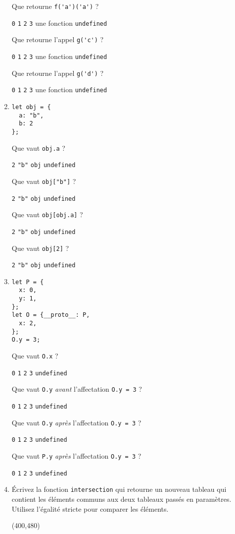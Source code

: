\documentclass[a4paper, 12pt]{article}
\newcommand{\choice}[1]{\Square\hspace{2pt} #1\hspace{5pt}}
\newcommand{\choicec}[1]{\Square\hspace{2pt} \lstinline{#1}\hspace{5pt}}
\begin{document}
\begin{enumerate}
  Que retourne \lstinline{f('a')('a')} ?

  \choicec{0} \choicec{1} \choicec{2} \choicec{3} \choice{une fonction} \choicec{undefined}

  Que retourne l'appel \lstinline{g('c')} ?

  \choicec{0} \choicec{1} \choicec{2} \choicec{3} \choice{une fonction} \choicec{undefined}

  Que retourne l'appel \lstinline{g('d')} ?

  \choicec{0} \choicec{1} \choicec{2} \choicec{3} \choice{une fonction} \choicec{undefined}
\item \lstset{language=javascript}
\begin{lstlisting}
let obj = {
  a: "b",
  b: 2
};
\end{lstlisting}

  Que vaut \lstinline{obj.a} ?

  \choicec{2} \choicec{"b"} \choicec{obj} \choicec{undefined}

  Que vaut \lstinline{obj["b"]} ?

  \choicec{2} \choicec{"b"} \choicec{obj} \choicec{undefined}

  Que vaut \lstinline{obj[obj.a]} ?

  \choicec{2} \choicec{"b"} \choicec{obj} \choicec{undefined}

  Que vaut \lstinline{obj[2]} ?

  \choicec{2} \choicec{"b"} \choicec{obj} \choicec{undefined}
\item \begin{lstlisting}
let P = {
  x: 0,
  y: 1,
};
let O = {__proto__: P,
  x: 2,
};
O.y = 3;
\end{lstlisting}

  Que vaut \lstinline{O.x} ?

  \choicec{0} \choicec{1} \choicec{2} \choicec{3} \choicec{undefined}

  Que vaut \lstinline{O.y} \emph{avant} l'affectation \lstinline{O.y = 3} ?

  \choicec{0} \choicec{1} \choicec{2} \choicec{3} \choicec{undefined}

  Que vaut \lstinline{O.y} \emph{après} l'affectation \lstinline{O.y = 3} ?

  \choicec{0} \choicec{1} \choicec{2} \choicec{3} \choicec{undefined}

  Que vaut \lstinline{P.y} \emph{après} l'affectation \lstinline{O.y = 3} ?

  \choicec{0} \choicec{1} \choicec{2} \choicec{3} \choicec{undefined}

\newpage
\item Écrivez la fonction \lstinline{intersection} qui retourne un nouveau
  tableau qui contient les éléments communs aux deux tableaux passés en
  paramètres.  Utilisez l'égalité stricte pour comparer les éléments.

  \framebox(400,480){}
\end{enumerate}
\end{document}
